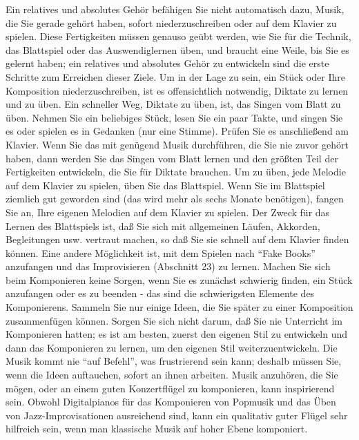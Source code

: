 Ein relatives und absolutes Gehör befähigen Sie nicht automatisch dazu, Musik, die Sie gerade gehört haben, sofort niederzuschreiben oder auf dem Klavier zu spielen.
Diese Fertigkeiten müssen genauso geübt werden, wie Sie für die Technik, das Blattspiel oder das Auswendiglernen üben, und braucht eine Weile, bis Sie es gelernt haben; ein relatives und absolutes Gehör zu entwickeln sind die erste Schritte zum Erreichen dieser Ziele.
Um in der Lage zu sein, ein Stück oder Ihre Komposition niederzuschreiben, ist es offensichtlich notwendig, Diktate zu lernen und zu üben.
Ein schneller Weg, Diktate zu üben, ist, das Singen vom Blatt zu üben.
Nehmen Sie ein beliebiges Stück, lesen Sie ein paar Takte, und singen Sie es oder spielen es in Gedanken (nur eine Stimme).
Prüfen Sie es anschließend am Klavier.
Wenn Sie das mit genügend Musik durchführen, die Sie nie zuvor gehört haben, dann werden Sie das Singen vom Blatt lernen und den größten Teil der Fertigkeiten entwickeln, die Sie für Diktate brauchen.
Um zu üben, jede Melodie auf dem Klavier zu spielen, üben Sie das Blattspiel.
Wenn Sie im Blattspiel ziemlich gut geworden sind (das wird mehr als sechs Monate benötigen), fangen Sie an, Ihre eigenen Melodien auf dem Klavier zu spielen.
Der Zweck für das Lernen des Blattspiels ist, daß Sie sich mit allgemeinen Läufen, Akkorden, Begleitungen usw. vertraut machen, so daß Sie sie schnell auf dem Klavier finden können.
Eine andere Möglichkeit ist, mit dem Spielen nach \enquote{Fake Books} anzufangen und das Improvisieren (Abschnitt 23) zu lernen.
Machen Sie sich beim Komponieren keine Sorgen, wenn Sie es zunächst schwierig finden, ein Stück anzufangen oder es zu beenden - das sind die schwierigsten Elemente des Komponierens.
Sammeln Sie nur einige Ideen, die Sie später zu einer Komposition zusammenfügen können.
Sorgen Sie sich nicht darum, daß Sie nie Unterricht im Komponieren hatten; es ist am besten, zuerst den eigenen Stil zu entwickeln und dann das Komponieren zu lernen, um den eigenen Stil weiterzuentwickeln.
Die Musik kommt nie \enquote{auf Befehl}, was frustrierend sein kann; deshalb müssen Sie, wenn die Ideen auftauchen, sofort an ihnen arbeiten.
Musik anzuhören, die Sie mögen, oder an einem guten Konzertflügel zu komponieren, kann inspirierend sein.
Obwohl Digitalpianos für das Komponieren von Popmusik und das Üben von Jazz-Improvisationen ausreichend sind, kann ein qualitativ guter Flügel sehr hilfreich sein, wenn man klassische Musik auf hoher Ebene komponiert.



